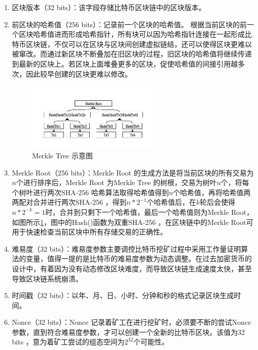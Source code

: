 				\begin{enumerate}
				\item 区块版本（32 bits）：该字段存储比特币区块链中的区块版本。
				\item 前区块的哈希值（256 bits）：记录前一个区块的哈希值。 根据当前区块的前一个区块哈希值进而形成哈希指针，所有块可以因为哈希指针连接在一起形成比特币区块链，不仅可以在区块与区块间创建虚拟链结，还可以使得区块更难以被窜改。而通过新区块不断叠加在旧区块的过程，旧区块的哈希值将继续传递到最新的区块上。若区块上面堆叠更多的区块，促使哈希值的间接引⽤越多次，因此较早创建的区块更难以修改。

				\begin{figure}[!htbp]
					\centering
					\includegraphics[width = 0.6\textwidth]{MerkleRoot.pdf}
					\caption{Merkle Tree 示意图}\label{MerkleRoot}
				\end{figure}

				\item Merkle Root（256 bits）：Merkle Root 的生成方法是将当前区块的所有交易为$n$个进行排序后，Merkle Root 为Merkle Tree 的树根，交易为树叶$n$个，将每个树叶进行两次SHA-256 哈希算法取得哈希值得到$n$个哈希值，再将哈希值两两配对合并进行两次SHA-256 ，得到$n*2^{-1}$个哈希值后，在$k$轮后会使得$n*2^{-k}=1$时，合并到只剩下一个哈希值，最后一个哈希值则为Merkle Root，如图所示\ref{MerkleRoot}，图中的Hash()函数为双重SHA-256 ，在区块链中的Merkle Root可用于快速检查当前区块中所有存储交易的正确性。

				

				\item 难易度（32 bits）：难易度参数主要调控比特币挖矿过程中采用工作量证明算法的变量，值得一提的是比特币的难易度参数为动态调整。在过去加密货币的设计中，有着因为没有动态修改区块难度，而导致区块链生成速度太快，甚至导致区块链系统崩溃。
				\item 时间戳（32 bits）：以年、月、日、小时、分钟和秒的格式记录区块生成时间。
				\item Nonce（32 bits）：Nonce 记录着矿工在进行挖矿时，必须要不断的尝试Nonce 参数，直到符合难易度参数，才可以创建一个全新的比特币区块。该值为32 bits ，意为着矿工尝试的组态空间为$2^{32}$个可能性。
				\end{enumerate}
				
